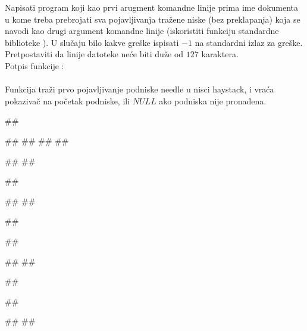\begin{Exercise}[label=A_04]
Napisati program koji kao prvi arugment komandne linije prima ime dokumenta u kome treba prebrojati sva pojavljivanja tražene niske (bez preklapanja) koja se navodi kao drugi argument komandne linije (iskoristiti funkciju standardne biblioteke ). U slučaju
bilo kakve greške ispisati $-1$ na standardni izlaz za greške.
Pretpostaviti da linije datoteke neće biti duže od $127$
karaktera.\\
Potpis funkcije :\\
\\
Funkcija traži prvo pojavljivanje podniske needle u nisci
haystack, i vraća pokazivač na početak podniske, ili
$NULL$ ako podniska nije pronađena.

\begin{miditest}
\begin{test}{1}
##

##
##
##
##

#\naslovIzlaz#
##
\end{test}
\end{miditest}
\begin{miditest}
\begin{test}{2}
##

#\naslovIzlazZaGresku#
## 
\end{test}
\end{miditest}

\begin{miditest}
\begin{test}{3}
##

##

#\naslovIzlazZaGresku#
##
\end{test}
\end{miditest}
\begin{miditest}
\begin{test}{4}
##

##

#\naslovIzlaz#
##
\end{test}
\end{miditest}

\end{Exercise}
\begin{Answer}[ref=A_04]
\end{Answer}


